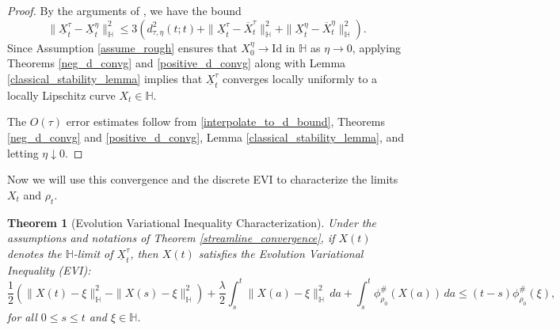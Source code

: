 \documentclass[11pt,a4paper]{amsart}
\newcommand{\1}{\mathds{1}}
\newtheorem{theorem}{\textbf{Theorem}}[section]
\numberwithin{equation}{section}
\begin{document}
\begin{proof}
By the arguments of \cite[Theorem 4.2.2]{ambrosio2005gradient}, we have the bound
\begin{equation}
\|\underline{X}^{\tau}_t - \underline{X}^{\eta}_t\|^2_{\mathbb{H}} 
\leq 3 \left( d^2_{\tau,\eta}(t;t) 
+ \|\underline{X}^{\tau}_t - \overline{X}^{\tau}_t\|^2_{\mathbb{H}} 
+ \|\underline{X}^{\eta}_t - \overline{X}^{\eta}_t\|^2_{\mathbb{H}} \right). \label{interpolate_to_d_bound}
\end{equation}
Since Assumption \ref{assume_rough} ensures that $X_0^{\eta} \to \text{Id}$ in $\mathbb{H}$ as $\eta \to 0$, applying Theorems \ref{neg_d_convg} and \ref{positive_d_convg} along with Lemma \ref{classical_stability_lemma} implies that $\underline{X}^{\tau}_t$ converges locally uniformly to a locally Lipschitz curve $X_t \in \mathbb{H}$. 

\smallskip

\noindent The $O(\tau)$ error estimates follow from \eqref{interpolate_to_d_bound}, Theorems \ref{neg_d_convg} and \ref{positive_d_convg}, Lemma \ref{classical_stability_lemma}, and letting $\eta \downarrow 0$.
\end{proof}




  
Now we will use this convergence and the discrete EVI to characterize the limits $X_t$ and $\rho_t$.

\begin{theorem}[Evolution Variational Inequality Characterization]  \label{solves_EVI}
Under the assumptions and notations of Theorem \ref{streamline_convergence}, if $X(t)$ denotes the $\mathbb{H}$-limit of $\underline{X}_t^{\tau}$, then $X(t)$ satisfies the Evolution Variational Inequality (EVI):
\begin{equation} 
\frac{1}{2} \left( \|X(t) - \xi\|^2_{\mathbb{H}} - \|X(s) - \xi\|^2_{\mathbb{H}} \right) 
+ \frac{\lambda}{2} \int_s^t \|X(a) - \xi\|^2_{\mathbb{H}} \, da 
+ \int_s^t \phi^{\#}_{\rho_0}(X(a)) \, da 
\leq  (t-s)\phi^{\#}_{\rho_0}(\xi),
\label{continuous_EVI}
\end{equation} 
for all $0 \leq s \leq t$ and $\xi \in \mathbb{H}$.  
\end{theorem}
\end{document}

